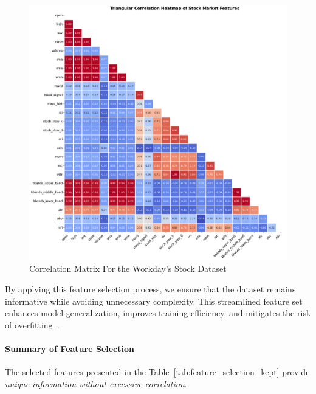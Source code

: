 \begin{figure}[H]%
    \centering
    \caption{Correlation Matrix For the Workday's Stock Dataset}
    \label{fig:app-correlation}
    \includegraphics[width=\linewidth]{img/sections/main/correlation.png}
\end{figure}

By applying this feature selection process, we ensure that the dataset remains informative 
while avoiding unnecessary complexity. This streamlined feature set enhances model
generalization, improves training efficiency, and mitigates the risk of 
overfitting~\parencite{shaban2024SMPDL, phuoc2024StockPrediction}.

\paragraph{Summary of Feature Selection} The selected features presented in the
Table~\ref{tab:feature_selection_kept} provide 
\emph{unique information without excessive correlation}.

